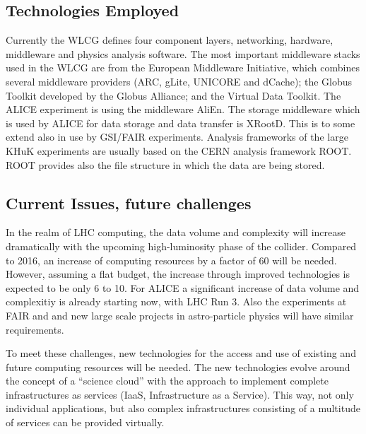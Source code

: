 \subsection{Technologies Employed}
Currently the WLCG defines four component layers,  networking, hardware, middleware and
physics analysis software. The most important middleware stacks used
in the WLCG are from the European Middleware Initiative, which
combines several middleware providers (ARC, gLite, UNICORE and
dCache); the Globus Toolkit developed by the Globus Alliance; and the
Virtual Data Toolkit. The ALICE experiment is using the middleware
AliEn.
The storage middleware which is used by ALICE for data storage and data transfer is XRootD.
This is to some extend also in use by GSI/FAIR experiments.
Analysis frameworks of the large KHuK experiments are usually based on the CERN analysis framework ROOT.
ROOT provides also the file structure in which the data are being stored.


\subsection{Current Issues, future challenges}
In the realm of LHC computing, the data volume and complexity will
increase dramatically with the upcoming high-luminosity phase of the
collider. Compared to 2016, an increase of computing resources by a
factor of 60 will be needed. However, assuming a flat budget, the
increase through improved technologies is expected to be only 6 to
10. 
For ALICE a significant increase of data volume and complexitiy is already starting now, with
LHC Run 3.
Also the
experiments at FAIR  and and new large scale projects in astro-particle
physics will have similar requirements. 

To meet these challenges, new technologies for the access and use of
existing and future computing resources will be needed. The new
technologies evolve around the concept of a ``science cloud'' with the
approach to implement complete infrastructures as services (IaaS,
Infrastructure as a Service). This way, not only individual
applications, but also complex infrastructures consisting of a
multitude of services can be provided virtually. 

